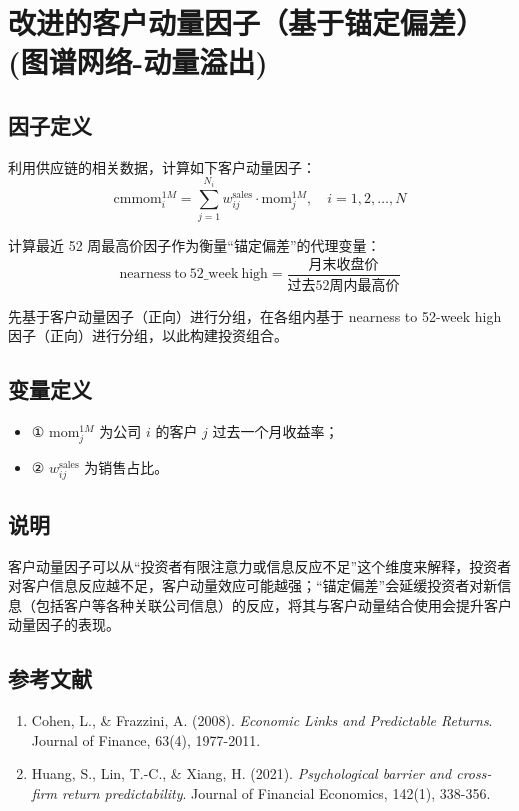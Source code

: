 \documentclass{article}
\begin{document}
\section{改进的客户动量因子（基于锚定偏差）(图谱网络-动量溢出)}

\subsection{因子定义}
利用供应链的相关数据，计算如下客户动量因子：
\begin{equation}
    \mathrm{cmmom}_i^{1M} = \sum_{j=1}^{N_i} w_{ij}^{\mathrm{sales}} \cdot \mathrm{mom}_j^{1M}, \quad i = 1, 2, \ldots, N
\end{equation}

计算最近 52 周最高价因子作为衡量“锚定偏差”的代理变量：
\begin{equation}
    \mathrm{nearness\ to\ 52\_week\ high} = \frac{\text{月末收盘价}}{\text{过去52周内最高价}}
\end{equation}

先基于客户动量因子（正向）进行分组，在各组内基于 nearness to 52-week high 因子（正向）进行分组，以此构建投资组合。

\subsection{变量定义}
\begin{itemize}
    \item ① \( \mathrm{mom}_j^{1M} \) 为公司 \( i \) 的客户 \( j \) 过去一个月收益率；
    \item ② \( w_{ij}^{\mathrm{sales}} \) 为销售占比。
\end{itemize}

\subsection{说明}
客户动量因子可以从“投资者有限注意力或信息反应不足”这个维度来解释，投资者对客户信息反应越不足，客户动量效应可能越强；“锚定偏差”会延缓投资者对新信息（包括客户等各种关联公司信息）的反应，将其与客户动量结合使用会提升客户动量因子的表现。

\subsection{参考文献}
\begin{enumerate}
    \item Cohen, L., \& Frazzini, A. (2008). \textit{Economic Links and Predictable Returns}. Journal of Finance, 63(4), 1977-2011.
    \item Huang, S., Lin, T.-C., \& Xiang, H. (2021). \textit{Psychological barrier and cross-firm return predictability}. Journal of Financial Economics, 142(1), 338-356.
\end{enumerate}
\end{document}

